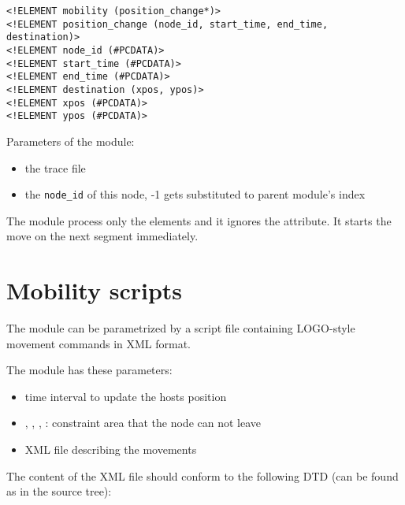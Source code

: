 \begin{description}
\begin{verbatim}
<!ELEMENT mobility (position_change*)>
<!ELEMENT position_change (node_id, start_time, end_time, destination)>
<!ELEMENT node_id (#PCDATA)>
<!ELEMENT start_time (#PCDATA)>
<!ELEMENT end_time (#PCDATA)>
<!ELEMENT destination (xpos, ypos)>
<!ELEMENT xpos (#PCDATA)>
<!ELEMENT ypos (#PCDATA)>
\end{verbatim}

Parameters of the module:

\begin{itemize}
  \item {} the trace file
  \item {} the \verb!node_id! of this node, -1 gets substituted to
  parent module's index
\end{itemize}

\begin{note}
The  module process only the 
elements and it ignores the  attribute. It starts the move
on the next segment immediately.
\end{note}


\end{description}




\section{Mobility scripts}

The  module can be parametrized by a script file
containing LOGO-style movement commands in XML format.

The module has these parameters:

\begin{itemize}
\item {} time interval to update the hosts position
\item {}, , ,
      : constraint area that the node can not leave
\item {} XML file describing the movements
\end{itemize}

The content of the XML file should conform to the following DTD (can be
found as  in the source tree):

